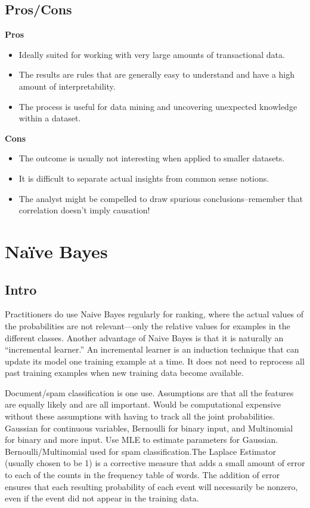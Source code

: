 \documentclass[]{book}
\theoremstyle{definition}
\theoremstyle{definition}
\theoremstyle{definition}
\theoremstyle{remark}
\begin{document}
\subsection{Pros/Cons}\label{proscons-14}

\textbf{Pros}

\begin{itemize}
\item
  Ideally suited for working with very large amounts of transactional
  data.
\item
  The results are rules that are generally easy to understand and have a
  high amount of interpretability.
\item
  The process is useful for data mining and uncovering unexpected
  knowledge within a dataset.
\end{itemize}

\textbf{Cons}

\begin{itemize}
\item
  The outcome is usually not interesting when applied to smaller
  datasets.
\item
  It is difficult to separate actual insights from common sense notions.
\item
  The analyst might be compelled to draw spurious conclusions--remember
  that correlation doesn't imply causation!
\end{itemize}

\section{Naïve Bayes}\label{naive-bayes}

\subsection{Intro}\label{intro-15}

Practitioners do use Naive Bayes regularly for ranking, where the actual
values of the probabilities are not relevant---only the relative values
for examples in the different classes. Another advantage of Naive Bayes
is that it is naturally an ``incremental learner.'' An incremental
learner is an induction technique that can update its model one training
example at a time. It does not need to reprocess all past training
examples when new training data become available.

Document/spam classification is one use. Assumptions are that all the
features are equally likely and are all important. Would be
computational expensive without these assumptions with having to track
all the joint probabilities. Gaussian for continuous variables,
Bernoulli for binary input, and Multinomial for binary and more input.
Use MLE to estimate parameters for Gaussian. Bernoulli/Multinomial used
for spam classification.The Laplace Estimator (usually chosen to be 1)
is a corrective measure that adds a small amount of error to each of the
counts in the frequency table of words. The addition of error ensures
that each resulting probability of each event will necessarily be
nonzero, even if the event did not appear in the training data.
\end{document}
